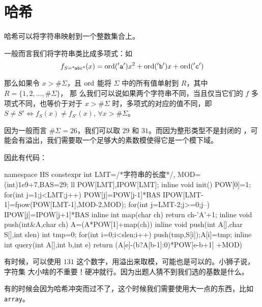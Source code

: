 \section{哈希} \label{sec:哈希}
哈希可以将字符串映射到一个整数集合上。

一般而言我们将字符串类比成多项式：如 $$f_{S = \text{\ttfamily "abc"}}(x) =
\mathrm{ord}(\mathtt{'a'})x^2 + \mathrm{ord}(\mathtt{'b'})x + \mathrm{ord}(\mathtt{'c'})$$

那么如果令 $x > \#\Sigma$，且 $\mathrm{ord}$ 能将 $\Sigma$ 中的所有值单射到 $R$，其中
$R = \{1, 2, \ldots, \#\Sigma\}$， 那
么我们可以说如果两个字符串不同，当且仅当它们的 $f$ 多
项式不同，也等价于对于 $x > \#\Sigma$ 时，多项式的对应的值不同，即 $S \ne S' \iff
f_S(x) \ne f_{S'}(x),\, \forall x > \#\Sigma$。

因为一般而言 $\#\Sigma = 26$，我们可以取 $29$ 和 $31$。而因为整形类型不是封闭的
，可能会有溢出，我们需要取一个足够大的素数模使得它是一个模下域。

因此有代码：
\begin{Cpp}
namespace HS{
  constexpr int LMT=/*字符串的长度*/,
    MOD=(int)1e9+7,BAS=29;
  ll POW[LMT],IPOW[LMT];
  inline void init(){
    POW[0]=1;
    for(int j=1;j<LMT;j++){
      POW[j]=POW[j-1]*BAS%
    }
    IPOW[LMT-1]=fpow(POW[LMT-1],MOD-2,MOD);
    for(int j=LMT-2;j>=0;j--){
      IPOW[j]=IPOW[j+1]*BAS%
    }
  }
  inline int map(char ch){
    return ch-'A'+1;
  }
  inline void push(int&A,char ch){
    A=(A*POW[1]+map(ch))%
  }
  inline void push(int A[],char S[],int slen){
    int tmp=0;
    for(int i=0;i<slen;i++){
      push(tmp,S[i]);A[i]=tmp;
    }
  }
  inline int query(int A[],int b,int e){
    return (A[e]-(b?A[b-1]:0)*POW[e-b+1]%
      +MOD)%
  }
}
\end{Cpp}

有时候，可以使用 $131$ 这个数字，用溢出来取模，可能也是可以的。小狮子说，字符集
大小啥的不重要！硬冲就行。因为出题人猜不到我们选的基数是什么。

有的时候会因为哈希冲突而过不了，这个时候我们需要使用大一点的东西，比如
\verb|array|。

